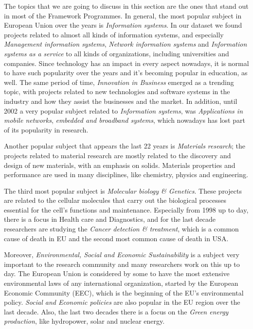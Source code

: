 \documentclass[12pt]{report}
\begin{document}
The topics that we are going to discuss in this section are the ones that
stand out in most of the Framework Programmes.
In general, the most popular subject in European Union over the years
is \emph{Information systems}. In our dataset we found projects
related to almost all kinds of information systems, and especially 
\emph{Management information
systems}, \emph{Network information systems} and \emph{Information systems as a
service} to all kinds of organizations, including universities and
companies. Since technology has an impact in every aspect nowadays, it
is normal to have such popularity over the years and it's becoming
popular in education, as well. The same period of time, \emph{Innovation in
Business} emerged as a trending topic, with projects related to new
technologies and software systems in the industry and how they assist
the businesses and the market. In addition, until 2002 a very popular
subject related to \emph{Information systems}, was \emph{Applications in mobile
networks}, \emph{embedded and broadband systems}, which nowadays has lost part
of its popularity in research.

Another popular subject that appears the last 22 years is \emph{Materials research};
the projects related to material research are mostly related to the discovery
and design of new materials, with an emphasis on solids. Materials properties
and performance are used in many disciplines, like chemistry, physics and
engineering.

The third most popular subject is \emph{Molecular biology \& Genetics}.
These projects are related to the cellular molecules that carry out
the biological processes essential for the cell's functions and
maintenance. Especially from 1998 up to day, there is a focus in
Health care and Diagnostics, and for the last decade researchers are
studying the \emph{Cancer detection \& treatment}, which is a common cause
of death in EU and the second most common cause of death in USA.

Moreover, \emph{Environmental, Social and Economic Sustainability} is a
subject very important to the research community and many researchers
work on this up to day. 
The European Union is considered by some to have the most extensive
environmental laws of any international organization, started by the
European Economic Community (EEC), which is the beginning of the EU's
environmental policy. \emph{Social and Economic policies} are also popular in
the EU region over the last decade. Also, the last two decades there
is a focus on the \emph{Green energy production}, like hydropower, solar and
nuclear energy.
\end{document}
